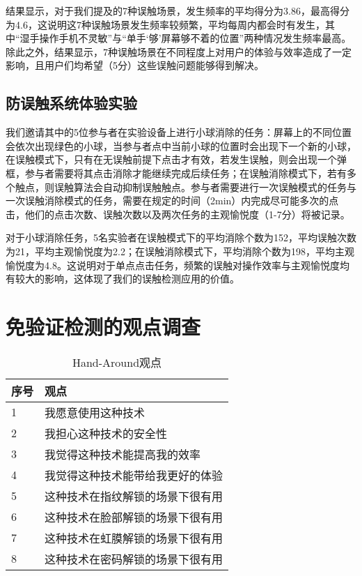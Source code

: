 结果显示，对于我们提及的7种误触场景，发生频率的平均得分为3.86，最高得分为4.6，这说明这7种误触场景发生频率较频繁，平均每周内都会时有发生，其中“湿手操作手机不灵敏”与“单手‘够’屏幕够不着的位置”两种情况发生频率最高。除此之外，结果显示，7种误触场景在不同程度上对用户的体验与效率造成了一定影响，且用户们均希望（5分）这些误触问题能够得到解决。

\subsection{防误触系统体验实验}

我们邀请其中的5位参与者在实验设备上进行小球消除的任务：屏幕上的不同位置会依次出现绿色的小球，当参与者点中当前小球的位置时会出现下一个新的小球，在误触模式下，只有在无误触前提下点击才有效，若发生误触，则会出现一个弹框，参与者需要将其点击消除才能继续完成后续任务；在误触消除模式下，若有多个触点，则误触算法会自动抑制误触触点。参与者需要进行一次误触模式的任务与一次误触消除模式的任务，需要在规定的时间（2min）内完成尽可能多次的点击，他们的点击次数、误触次数以及两次任务的主观愉悦度（1-7分）将被记录。

对于小球消除任务，5名实验者在误触模式下的平均消除个数为152，平均误触次数为21，平均主观愉悦度为2.2；在误触消除模式下，平均消除个数为198，平均主观愉悦度为4.8。这说明对于单点点击任务，频繁的误触对操作效率与主观愉悦度均有较大的影响，这体现了我们的误触检测应用的价值。

\section{免验证检测的观点调查}

\begin{table}[htbp]
\centering
\caption{Hand-Around观点}
\label{HandAroundOp}
\begin{tabular}{p{40 pt}p{200 pt}}
 \toprule
序号 & 观点 \\
 \midrule
1 & 我愿意使用这种技术 \\
2 & 我担心这种技术的安全性 \\
3 & 我觉得这种技术能提高我的效率 \\
4 & 我觉得这种技术能带给我更好的体验 \\
5 & 这种技术在指纹解锁的场景下很有用 \\
6 & 这种技术在脸部解锁的场景下很有用 \\
7 & 这种技术在虹膜解锁的场景下很有用 \\
8 & 这种技术在密码解锁的场景下很有用 \\
\bottomrule
 \end{tabular}\\[2pt]
\end{table}

